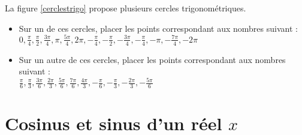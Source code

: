 \begin{exo}\label{trigoexo2}
La figure \ref{cerclestrigo}  propose plusieurs cercles trigonom\'etriques.
 
  \begin{itemize}
   \item Sur un de ces cercles, placer les points correspondant aux nombres suivant : \\$0, \frac{\pi}{4}, \frac{\pi}{2}, \frac{3\pi}{4}, \pi, \frac{5\pi}{4}, 2\pi, -\frac{\pi}{4}, -\frac{\pi}{2}, -\frac{3\pi}{4}, -\frac{\pi}{4}, -\pi, -\frac{7\pi}{4}, -2\pi$
   \item Sur un autre de ces cercles, placer les points correspondant aux nombres suivant :\\ $\frac{\pi}{6}, \frac{\pi}{3}, \frac{3\pi}{6}, \frac{2\pi}{3}, \frac{5\pi}{6}, \frac{7\pi}{6}, \frac{4\pi}{3}, -\frac{\pi}{6}, -\frac{\pi}{3}, -\frac{2\pi}{3}, -\frac{5\pi}{6}$
  \end{itemize}

\end{exo}


\section{Cosinus et sinus d'un réel $x$}

